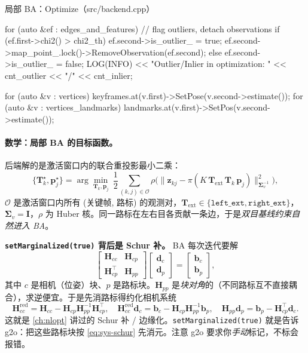 \begin{codebox}[C++]{局部 BA：Optimize（src/backend.cpp）}
{    for (auto &ef : edges_and_features) {          // flag outliers, detach observations
        if (ef.first->chi2() > chi2_th) {
            ef.second->is_outlier_ = true;
            ef.second->map_point_.lock()->RemoveObservation(ef.second);
        } else {
            ef.second->is_outlier_ = false;
        }
    }
    LOG(INFO) << "Outlier/Inlier in optimization: " << cnt_outlier << "/" << cnt_inlier;

    for (auto &v : vertices)            keyframes.at(v.first)->SetPose(v.second->estimate());
    for (auto &v : vertices_landmarks)  landmarks.at(v.first)->SetPos(v.second->estimate());
}
\end{codebox}

\paragraph{数学：局部 BA 的目标函数。}
后端解的是激活窗口内的联合重投影最小二乘：
\begin{equation}
\{\mathbf{T}_k^\star,\mathbf{p}_j^\star\}=\arg\min_{\mathbf{T}_k,\mathbf{p}_j}\ \frac12\sum_{(k,j)\in\mathcal{O}}\rho\Big(\big\|\mathbf{z}_{kj}-\pi(K\,\mathbf{T}_{\mathrm{ext}}\,\mathbf{T}_k\,\mathbf{p}_j)\big\|_{\boldsymbol\Sigma_v^{-1}}^2\Big),
\label{eq:sys-localba}
\end{equation}
$\mathcal{O}$ 是激活窗口内所有 (关键帧, 路标) 的观测对，$\mathbf{T}_{\mathrm{ext}}\in\{\texttt{left\_ext},\texttt{right\_ext}\}$，$\boldsymbol\Sigma_v=\mathbf{I}$，$\rho$ 为 Huber 核。同一路标在左右目各贡献一条边，于是\emph{双目基线约束自然进入 BA}。

\begin{insight}
\textbf{\texttt{setMarginalized(true)} 背后是 Schur 补。}
BA 每次迭代要解
\begin{equation*}
\begin{bmatrix}\mathbf{H}_{cc}&\mathbf{H}_{cp}\\ \mathbf{H}_{cp}^\top&\mathbf{H}_{pp}\end{bmatrix}\!\begin{bmatrix}\mathbf{d}_c\\ \mathbf{d}_p\end{bmatrix}=\begin{bmatrix}\mathbf{b}_c\\ \mathbf{b}_p\end{bmatrix},
\end{equation*}
其中 $c$ 是相机（位姿）块、$p$ 是路标块。$\mathbf{H}_{pp}$ 是\emph{块对角}的（不同路标互不直接耦合），求逆便宜。于是先消路标得约化相机系统
\begin{equation}
\mathbf{H}_{cc}^{\text{red}}=\mathbf{H}_{cc}-\mathbf{H}_{cp}\mathbf{H}_{pp}^{-1}\mathbf{H}_{cp}^\top,\quad
\mathbf{H}_{cc}^{\text{red}}\mathbf{d}_c=\mathbf{b}_c-\mathbf{H}_{cp}\mathbf{H}_{pp}^{-1}\mathbf{b}_p,\quad
\mathbf{H}_{pp}\mathbf{d}_p=\mathbf{b}_p-\mathbf{H}_{cp}^\top\mathbf{d}_c.
\label{eq:sys-schur}
\end{equation}
这就是 \cref{ch:nlopt} 讲过的 Schur 补 / 边缘化。\verb|setMarginalized(true)| 就是告诉 g2o：把这些路标块按 \cref{eq:sys-schur} 先消元。注意 g2o 要求你\emph{手动}标记，不标会报错。
\end{insight}


